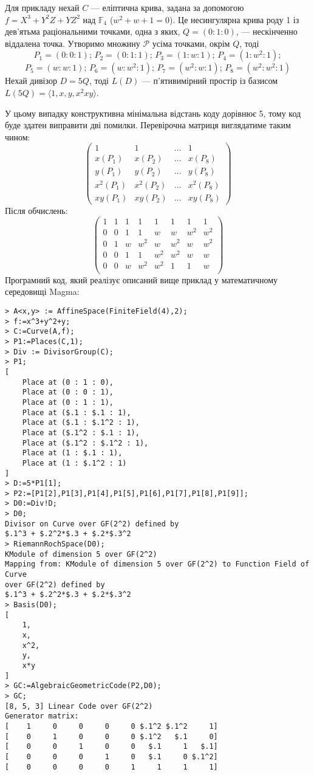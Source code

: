 \documentclass[a4paper,12pt,oneside]{article}
\begin{document}
Для прикладу нехай $C$ --- еліптична крива, задана за допомогою $f=X^3+Y^2Z+YZ^2$ над $\mathbb{F}_4$ ($w^2+w+1=0$). 
Це несингулярна крива роду 1 із дев'ятьма раціональними точками, одна з яких, $Q=(0:1:0)$, --- нескінченно віддалена точка. 
Утворимо множину $\mathcal{P}$ усіма точками, окрім $Q$, тоді
$$P_1 = (0 : 0 : 1); \, P_2 = (0 : 1 : 1); \, P_3 = (1 : w : 1); \, P_4 = (1 : w^2 : 1);$$ 
$$P_5 = (w : w : 1); \, P_6 = (w : w^2 : 1); \, P_7 = (w^2 : w : 1); \, P_8 = (w^2 : w^2 : 1)$$
Нехай дивізор $D=5Q$, тоді $L(D)$ --- п'ятивимірний простір із базисом $L(5Q) = \langle 1, x, y, x^2 xy \rangle$.

У цьому випадку конструктивна мінімальна відстань коду дорівнює 5, тому код буде здатен виправити дві помилки.
Перевірочна матриця виглядатиме таким чином:
$$
\begin{pmatrix}
1 & 1 & \dots & 1 \\
x(P_1) & x(P_2) & \dots & x(P_8) \\
y(P_1) & y(P_2) & \dots & y(P_8) \\
x^2(P_1) & x^2(P_2) & \dots & x^2(P_8) \\
xy(P_1) & xy(P_2) & \dots & xy(P_8)
\end{pmatrix}
$$
Після обчислень:
$$
\begin{pmatrix}
1 & 1 & 1 & 1 & 1 & 1 & 1 & 1 \\
0 & 0 & 1 & 1 & w & w & w^2 & w^2 \\
0 & 1 & w & w^2 & w & w^2 & w & w^2 \\
0 & 0 & 1 & 1 & w^2 & w^2 & w & w \\
0 & 0 & w & w^2 & w^2 & 1 & 1 & w \\
\end{pmatrix}
$$
Програмний код, який реалізує описаний вище приклад у математичному середовищі Magma:
\begin{verbatim}
> A<x,y> := AffineSpace(FiniteField(4),2);
> f:=x^3+y^2+y;
> C:=Curve(A,f);
> P1:=Places(C,1);
> Div := DivisorGroup(C);
> P1;
[
    Place at (0 : 1 : 0),
    Place at (0 : 0 : 1),
    Place at (0 : 1 : 1),
    Place at ($.1 : $.1 : 1),
    Place at ($.1 : $.1^2 : 1),
    Place at ($.1^2 : $.1 : 1),
    Place at ($.1^2 : $.1^2 : 1),
    Place at (1 : $.1 : 1),
    Place at (1 : $.1^2 : 1)
]
> D:=5*P1[1];
> P2:=[P1[2],P1[3],P1[4],P1[5],P1[6],P1[7],P1[8],P1[9]];
> D0:=Div!D;
> D0;
Divisor on Curve over GF(2^2) defined by
$.1^3 + $.2^2*$.3 + $.2*$.3^2
> RiemannRochSpace(D0);
KModule of dimension 5 over GF(2^2)
Mapping from: KModule of dimension 5 over GF(2^2) to Function Field of Curve 
over GF(2^2) defined by
$.1^3 + $.2^2*$.3 + $.2*$.3^2
> Basis(D0);
[
    1,
    x,
    x^2,
    y,
    x*y
]
> GC:=AlgebraicGeometricCode(P2,D0);
> GC;
[8, 5, 3] Linear Code over GF(2^2)
Generator matrix:
[    1     0     0     0     0 $.1^2 $.1^2     1]
[    0     1     0     0     0 $.1^2   $.1     0]
[    0     0     1     0     0   $.1     1   $.1]
[    0     0     0     1     0   $.1     0 $.1^2]
[    0     0     0     0     1     1     1     1]
\end{verbatim}
\end{document}
